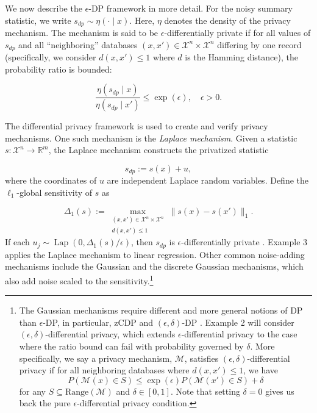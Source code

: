 We now describe the \(\epsilon\)-DP framework in more detail. For the noisy summary
statistic, we write \(s_{dp} \sim \eta(\cdot \mid x)\). Here, \(\eta\) denotes the
density of the privacy mechanism. The mechanism is said to be
\(\epsilon\)-differentially private \citep{Dwork2006} if for all values of \(s_{dp}\)
and all ``neighboring'' databases \((x,x') \in \mathcal{X}^n \times \mathcal{X}^n\) differing
by one record (specifically, we consider \(d(x,x') \leq 1\) where \(d\) is the Hamming distance), the probability ratio is bounded:

\begin{equation*}
\dfrac{\eta(s_{dp} \mid x)}{\eta(s_{dp} \mid x')} \leq \exp(\epsilon), \quad \epsilon > 0.
\end{equation*}

The differential privacy framework is used to create and verify privacy
mechanisms. One such mechanism is the \emph{Laplace mechanism}. Given a statistic
\(s: \mathcal{X}^n \to \mathbb{R}^m\), the Laplace mechanism constructs the
privatized statistic

\begin{equation*}
s_{dp} := s(x) + u,
\end{equation*}
where the coordinates of \(u\) are independent Laplace random variables. Define
the \(\ell_1\)-global sensitivity of \(s\) as

\begin{equation*}
\Delta_1(s) :=
\max_{\substack{(x,x') \in \mathcal{X}^n \times \mathcal{X}^n \\ d(x,x') \leq 1}}
\lVert s(x) - s(x') \rVert_1.
\end{equation*}
If each \(u_j \sim \operatorname{Lap}(0, \Delta_1(s) / \epsilon)\), then \(s_{dp}\)
is \(\epsilon\)-differentially private \citep{Dwork2006}. Example 3 applies the Laplace
mechanism to linear regression.
Other common noise-adding mechanisms include the Gaussian and the
discrete Gaussian mechanisms, which also add noise scaled to the sensitivity.\footnote{The
  Gaussian mechanisms require different and more general notions of DP than \(\epsilon\)-DP,
  in particular, zCDP \citep{Bun2016} and \((\epsilon, \delta)\)-DP \citep{Dwork2006p}.
  Example 2 will consider \((\epsilon, \delta)\)-differential privacy, which
  extends \(\epsilon\)-differential privacy to the case where the ratio bound
  can fail with probability governed by \(\delta\). More specifically, we say
  a privacy mechanism, \(\mathcal{M}\), satisfies \((\epsilon, \delta)\)-differential privacy if
  for all neighboring databases where \(d(x,x') \leq 1\), we have
  \[
  P(\mathcal{M}(x) \in S) \leq \exp(\epsilon)
  P(\mathcal{M}(x') \in S) + \delta
  \]
  for any \(S \subseteq \text{Range}(\mathcal{M})\) and \(\delta \in [0,1]\). Note that
  setting \(\delta = 0\) gives us back the pure \(\epsilon\)-differential privacy
  condition.}


